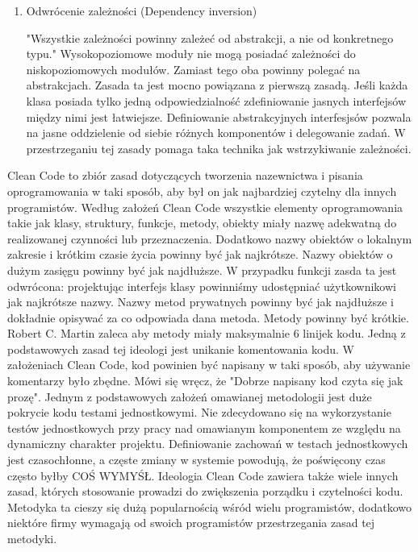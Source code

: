 \documentclass[oneside, eng]{mgr}
\begin{document}
\begin{enumerate}
\item Odwrócenie zależności (Dependency inversion)

"Wszystkie zależności powinny zależeć od abstrakcji, a nie od konkretnego typu." Wysokopoziomowe moduły nie mogą posiadać zależności do niskopoziomowych modułów. Zamiast tego oba powinny polegać na abstrakcjach. Zasada ta jest mocno powiązana z pierwszą zasadą. Jeśli każda klasa posiada tylko jedną odpowiedzialność zdefiniowanie jasnych interfejsów między nimi jest łatwiejsze. Definiowanie abstrakcyjnych interfesjsów pozwala na jasne oddzielenie od siebie różnych komponentów i delegowanie zadań. W przestrzeganiu tej zasady pomaga taka technika jak wstrzykiwanie zależności.

\end{enumerate}

Clean Code to zbiór zasad dotyczących tworzenia nazewnictwa i pisania oprogramowania w taki sposób, aby był on jak najbardziej czytelny dla innych programistów. Według założeń Clean Code wszystkie elementy oprogramowania takie jak klasy, struktury, funkcje, metody, obiekty miały nazwę adekwatną do realizowanej czynności lub przeznaczenia. Dodatkowo nazwy obiektów o lokalnym zakresie i krótkim czasie życia powinny być jak najkrótsze. Nazwy obiektów o dużym zasięgu powinny być jak najdłuższe. W przypadku funkcji zasda ta jest odwrócona: projektując interfejs klasy powinniśmy udostępniać użytkownikowi jak najkrótsze nazwy. Nazwy metod prywatnych powinny być jak najdłuższe i dokładnie opisywać za co odpowiada dana metoda. Metody powinny być krótkie. Robert C. Martin zaleca aby metody miały maksymalnie 6 linijek kodu. Jedną z podstawowych zasad tej ideologi jest unikanie komentowania kodu. W założeniach Clean Code, kod powinien być napisany w taki sposób, aby używanie komentarzy było zbędne. Mówi się wręcz, że "Dobrze napisany kod czyta się jak prozę". Jednym z podstawowych założeń omawianej metodologii jest duże pokrycie kodu testami jednostkowymi. Nie zdecydowano się na wykorzystanie testów jednostkowych przy pracy nad omawianym komponentem ze względu na dynamiczny charakter projektu. Definiowanie zachowań w testach jednostkowych jest czasochłonne, a częste zmiany w systemie powodują, że poświęcony czas często byłby COŚ WYMYŚŁ.  Ideologia Clean Code zawiera także wiele innych zasad, których stosowanie prowadzi do zwiększenia porządku i czytelności kodu. Metodyka ta cieszy się dużą popularnością wśród wielu programistów, dodatkowo niektóre firmy wymagają od swoich programistów przestrzegania zasad tej metodyki.
\end{document}
